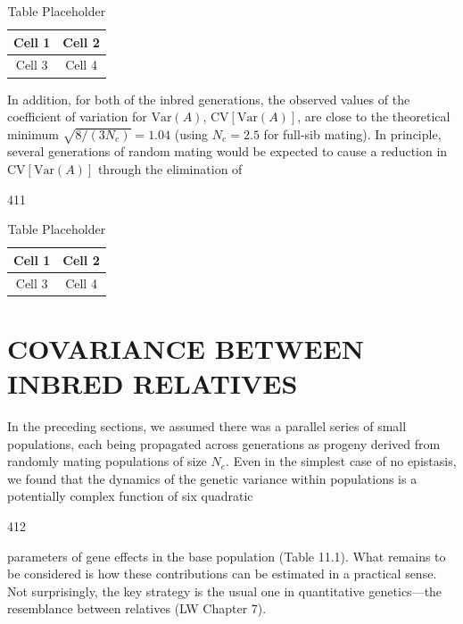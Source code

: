 \documentclass{article}
\begin{document}
\begin{table}[h]
\centering
\begin{tabular}{|c|c|}
\hline
Cell 1 & Cell 2 \\
\hline
Cell 3 & Cell 4 \\
\hline
\end{tabular}
\caption{Table Placeholder}
\end{table}

In addition, for both of the inbred generations, the observed values of the coefficient of variation for  $ \mathrm{Var}(A) $,  $ \mathrm{CV}[\mathrm{Var}(A)] $, are close to the theoretical minimum  $ \sqrt{8/(3N_e)} = 1.04 $ (using  $ N_e = 2.5 $ for full-sib mating). In principle, several generations of random mating would be expected to cause a reduction in  $ \mathrm{CV}[\mathrm{Var}(A)] $ through the elimination of

411

\begin{table}[h]
\centering
\begin{tabular}{|c|c|}
\hline
Cell 1 & Cell 2 \\
\hline
Cell 3 & Cell 4 \\
\hline
\end{tabular}
\caption{Table Placeholder}
\end{table}

\section{COVARIANCE BETWEEN INBRED RELATIVES}
In the preceding sections, we assumed there was a parallel series of small populations, each being propagated across generations as progeny derived from randomly mating populations of size  $ N_{e} $. Even in the simplest case of no epistasis, we found that the dynamics of the genetic variance within populations is a potentially complex function of six quadratic

412

parameters of gene effects in the base population (Table 11.1). What remains to be considered is how these contributions can be estimated in a practical sense. Not surprisingly, the key strategy is the usual one in quantitative genetics—the resemblance between relatives (LW Chapter 7).
\end{document}
